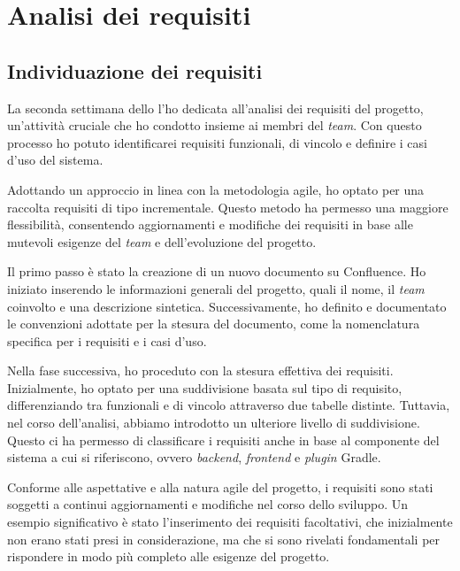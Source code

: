 \section{Analisi dei requisiti}
\subsection*{Individuazione dei requisiti}

La seconda settimana dello \stage{} l'ho dedicata all'analisi dei requisiti del progetto, un'attività cruciale che ho 
condotto insieme ai membri del \textit{team}. Con questo processo ho potuto identificarei requisiti 
funzionali, di vincolo e definire i casi d'uso del sistema.

Adottando un approccio in linea con la metodologia agile, ho optato per una raccolta requisiti di tipo incrementale. 
Questo metodo ha permesso una maggiore flessibilità, consentendo aggiornamenti e modifiche dei requisiti in base alle 
mutevoli esigenze del \textit{team} e dell'evoluzione del progetto.

Il primo passo è stato la creazione di un nuovo documento su Confluence. Ho iniziato inserendo le informazioni 
generali del progetto, quali il nome, il \textit{team} coinvolto e una descrizione sintetica. Successivamente, 
ho definito e documentato le convenzioni adottate per la stesura del documento, come la nomenclatura specifica per 
i requisiti e i casi d'uso.

Nella fase successiva, ho proceduto con la stesura effettiva dei requisiti. Inizialmente, ho optato per una 
suddivisione basata sul tipo di requisito, differenziando tra funzionali e di vincolo attraverso due tabelle distinte. 
Tuttavia, nel corso dell'analisi, abbiamo introdotto un ulteriore livello di suddivisione. Questo ci ha permesso di 
classificare i requisiti anche in base al componente del sistema a cui si riferiscono, ovvero \textit{backend}, 
\textit{frontend} e \textit{plugin} Gradle.

Conforme alle aspettative e alla natura agile del progetto, i requisiti sono stati soggetti a continui aggiornamenti 
e modifiche nel corso dello sviluppo. Un esempio significativo è stato l'inserimento dei requisiti facoltativi, 
che inizialmente non erano stati presi in considerazione, ma che si sono rivelati fondamentali per rispondere in 
modo più completo alle esigenze del progetto.

